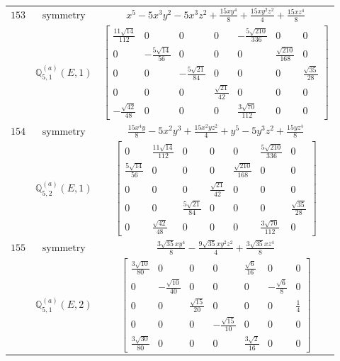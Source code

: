 \documentclass[fleqn,8pt,landscape]{jsarticle}
\begin{document}
\begin{longtable}{ccc}
$ 153 $ & $ \text{symmetry} $ & $ x^{5} - 5 x^{3} y^{2} - 5 x^{3} z^{2} + \frac{15 x y^{4}}{8} + \frac{15 x y^{2} z^{2}}{4} + \frac{15 x z^{4}}{8} $ \\
$  $ & $ \mathbb{Q}_{5,1}^{(a)}(E,1) $ & $ \begin{bmatrix} \frac{11 \sqrt{14}}{112} & 0 & 0 & 0 & - \frac{5 \sqrt{210}}{336} & 0 & 0 \\ 0 & - \frac{5 \sqrt{14}}{56} & 0 & 0 & 0 & \frac{\sqrt{210}}{168} & 0 \\ 0 & 0 & - \frac{5 \sqrt{21}}{84} & 0 & 0 & 0 & \frac{\sqrt{35}}{28} \\ 0 & 0 & 0 & \frac{\sqrt{21}}{42} & 0 & 0 & 0 \\ - \frac{\sqrt{42}}{48} & 0 & 0 & 0 & \frac{3 \sqrt{70}}{112} & 0 & 0 \end{bmatrix} $ \\ \hline
$ 154 $ & $ \text{symmetry} $ & $ \frac{15 x^{4} y}{8} - 5 x^{2} y^{3} + \frac{15 x^{2} y z^{2}}{4} + y^{5} - 5 y^{3} z^{2} + \frac{15 y z^{4}}{8} $ \\
$  $ & $ \mathbb{Q}_{5,2}^{(a)}(E,1) $ & $ \begin{bmatrix} 0 & \frac{11 \sqrt{14}}{112} & 0 & 0 & 0 & \frac{5 \sqrt{210}}{336} & 0 \\ \frac{5 \sqrt{14}}{56} & 0 & 0 & 0 & \frac{\sqrt{210}}{168} & 0 & 0 \\ 0 & 0 & 0 & \frac{\sqrt{21}}{42} & 0 & 0 & 0 \\ 0 & 0 & \frac{5 \sqrt{21}}{84} & 0 & 0 & 0 & \frac{\sqrt{35}}{28} \\ 0 & \frac{\sqrt{42}}{48} & 0 & 0 & 0 & \frac{3 \sqrt{70}}{112} & 0 \end{bmatrix} $ \\ \hline
$ 155 $ & $ \text{symmetry} $ & $ \frac{3 \sqrt{35} x y^{4}}{8} - \frac{9 \sqrt{35} x y^{2} z^{2}}{4} + \frac{3 \sqrt{35} x z^{4}}{8} $ \\
$  $ & $ \mathbb{Q}_{5,1}^{(a)}(E,2) $ & $ \begin{bmatrix} \frac{3 \sqrt{10}}{80} & 0 & 0 & 0 & \frac{\sqrt{6}}{16} & 0 & 0 \\ 0 & - \frac{\sqrt{10}}{40} & 0 & 0 & 0 & - \frac{\sqrt{6}}{8} & 0 \\ 0 & 0 & \frac{\sqrt{15}}{20} & 0 & 0 & 0 & \frac{1}{4} \\ 0 & 0 & 0 & - \frac{\sqrt{15}}{10} & 0 & 0 & 0 \\ \frac{3 \sqrt{30}}{80} & 0 & 0 & 0 & \frac{3 \sqrt{2}}{16} & 0 & 0 \end{bmatrix} $ \\ \hline

\end{longtable}
\end{document}
